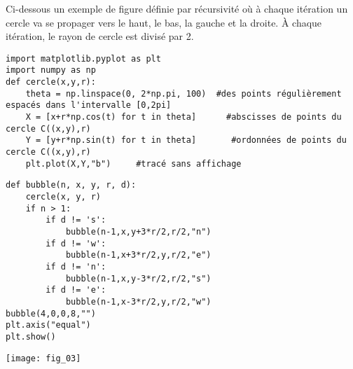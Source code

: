 Ci-dessous un exemple de figure définie par récursivité où à chaque itération un cercle va se propager vers le haut, le bas, la gauche et la droite. À chaque itération, le rayon de cercle est divisé par 2. 
\begin{lstlisting}
import matplotlib.pyplot as plt
import numpy as np
def cercle(x,y,r):
    theta = np.linspace(0, 2*np.pi, 100)  #des points régulièrement espacés dans l'intervalle [0,2pi]
    X = [x+r*np.cos(t) for t in theta]      #abscisses de points du cercle C((x,y),r)
    Y = [y+r*np.sin(t) for t in theta]       #ordonnées de points du cercle C((x,y),r)
    plt.plot(X,Y,"b")     #tracé sans affichage
\end{lstlisting}

\noindent\begin{minipage}[c]{.49\linewidth}
\begin{lstlisting}
def bubble(n, x, y, r, d):
    cercle(x, y, r)
    if n > 1:
        if d != 's':
            bubble(n-1,x,y+3*r/2,r/2,"n")
        if d != 'w':
            bubble(n-1,x+3*r/2,y,r/2,"e")
        if d != 'n':
            bubble(n-1,x,y-3*r/2,r/2,"s")
        if d != 'e':
            bubble(n-1,x-3*r/2,y,r/2,"w")
bubble(4,0,0,8,"")
plt.axis("equal")
plt.show()
\end{lstlisting}
\end{minipage} \hfill
\begin{minipage}[c]{.49\linewidth}
\begin{center}
\texttt{[image: fig\_03]}
\end{center}
\end{minipage}
%
%



